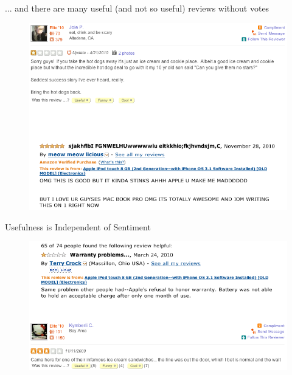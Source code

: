 \documentclass{beamer}
\begin{document}
\begin{frame}{... and there are many useful (and not so useful) reviews without votes}
\begin{figure}[h]
  \centering
  \includegraphics[scale=.4]{review_unvoted}
  \label{fig:dist}
\end{figure}
\end{frame}

\begin{frame}{Usefulness is Independent of Sentiment}
\begin{figure}[h]
  \centering
  \includegraphics[scale=.4]{review_ex_2}
  \label{fig:dist}
\end{figure}
\end{frame}
\end{document}
